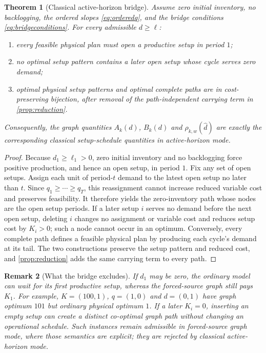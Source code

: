 \documentclass[11pt]{article}
\newtheorem{theorem}{Theorem}[section]
\newtheorem{remark}[theorem]{Remark}
\theoremstyle{definition}
\newcommand{\dhat}{\widehat d}
\newcommand{\ellv}{\ell}
\begin{document}
\begin{theorem}[Classical active-horizon bridge]\label{thm:semanticbridge}
Assume zero initial inventory, no backlogging, the ordered slopes \eqref{eq:orderedq}, and the bridge conditions \eqref{eq:bridgeconditions}. For every admissible $d\ge\ellv$:
\begin{enumerate}[label=(\alph*)]
\item every feasible physical plan must open a productive setup in period $1$;
\item no optimal setup pattern contains a later open setup whose cycle serves zero demand;
\item optimal physical setup patterns and optimal complete paths are in cost-preserving bijection, after removal of the path-independent carrying term in \cref{prop:reduction}.
\end{enumerate}
Consequently, the graph quantities $A_k(d)$, $B_k(d)$ and $\rho_{k,w}(\dhat)$ are exactly the corresponding classical setup-schedule quantities in active-horizon mode.
\end{theorem}

\begin{proof}
Because $d_1\ge\ell_1>0$, zero initial inventory and no backlogging force positive production, and hence an open setup, in period $1$. Fix any set of open setups. Assign each unit of period-$t$ demand to the latest open setup no later than $t$. Since $q_1\ge\cdots\ge q_T$, this reassignment cannot increase reduced variable cost and preserves feasibility. It therefore yields the zero-inventory path whose nodes are the open setup periods. If a later setup $i$ serves no demand before the next open setup, deleting $i$ changes no assignment or variable cost and reduces setup cost by $K_i>0$; such a node cannot occur in an optimum. Conversely, every complete path defines a feasible physical plan by producing each cycle's demand at its tail. The two constructions preserve the setup pattern and reduced cost, and \cref{prop:reduction} adds the same carrying term to every path.
\end{proof}

\begin{remark}[What the bridge excludes]\label{rem:bridgeexclusions}
If $d_1$ may be zero, the ordinary model can wait for its first productive setup, whereas the forced-source graph still pays $K_1$. For example, $K=(100,1)$, $q=(1,0)$ and $d=(0,1)$ have graph optimum $101$ but ordinary physical optimum $1$. If a later $K_i=0$, inserting an empty setup can create a distinct co-optimal graph path without changing an operational schedule. Such instances remain admissible in forced-source graph mode, where those semantics are explicit; they are rejected by classical active-horizon mode.
\end{remark}
\end{document}
